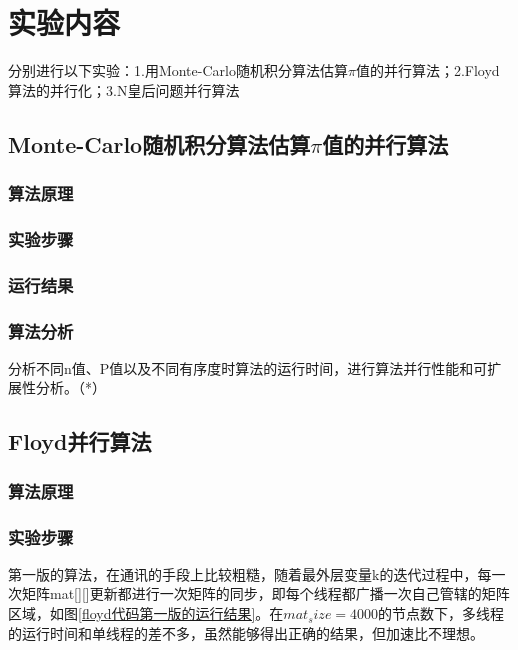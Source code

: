 \documentclass[10pt]{article}
\begin{document}
\section{实验内容}
分别进行以下实验：1.用Monte-Carlo随机积分算法估算$\pi$值的并行算法；2.Floyd算法的并行化；3.N皇后问题并行算法

\subsection{Monte-Carlo随机积分算法估算$\pi$值的并行算法}

\subsubsection{算法原理}



\subsubsection{实验步骤}

\subsubsection{运行结果}

\subsubsection{算法分析}
分析不同n值、P值以及不同有序度时算法的运行时间，进行算法并行性能和可扩展性分析。（*）

\subsection{Floyd并行算法}

\subsubsection{算法原理}

\subsubsection{实验步骤}

第一版的算法，在通讯的手段上比较粗糙，随着最外层变量k的迭代过程中，每一次矩阵mat[][]更新都进行一次矩阵的同步，即每个线程都广播一次自己管辖的矩阵区域，如图\ref{floyd代码第一版的运行结果}。在$mat_size=4000$的节点数下，多线程的运行时间和单线程的差不多，虽然能够得出正确的结果，但加速比不理想。
\end{document}
